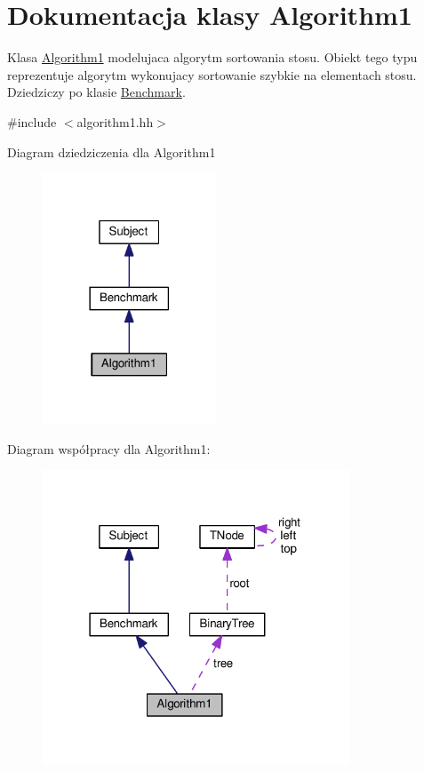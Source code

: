 \hypertarget{class_algorithm1}{\section{Dokumentacja klasy Algorithm1}
\label{class_algorithm1}
}


Klasa \hyperlink{class_algorithm1}{Algorithm1} modelujaca algorytm sortowania stosu. Obiekt tego typu reprezentuje algorytm wykonujacy sortowanie szybkie na elementach stosu. Dziedziczy po klasie \hyperlink{class_benchmark}{Benchmark}.  




{\ttfamily \#include $<$algorithm1.\-hh$>$}



Diagram dziedziczenia dla Algorithm1\nopagebreak
\begin{figure}[H]
\begin{center}
\leavevmode
\includegraphics[width=146pt]{class_algorithm1__inherit__graph}
\end{center}
\end{figure}


Diagram współpracy dla Algorithm1\-:\nopagebreak
\begin{figure}[H]
\begin{center}
\leavevmode
\includegraphics[width=259pt]{class_algorithm1__coll__graph}
\end{center}
\end{figure}
